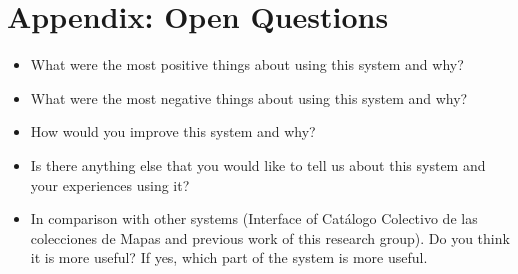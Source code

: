 \documentclass[11pt]{report}
\begin{document}


\chapter{Appendix: Open Questions}
\label{app:open}

\begin{itemize}
	\item What were the most positive things about using this system and why?
	\item What were the most negative things about using this system and why?
	\item How would you improve this system and why?
	\item Is there anything else that you would like to tell us about this system and your experiences using it?
	\item In comparison with other systems (Interface of Catálogo Colectivo de las colecciones de Mapas and previous work of this research group).
Do you think it is more useful? If yes, which part of the system is more useful.
\end{itemize}
\end{document}
